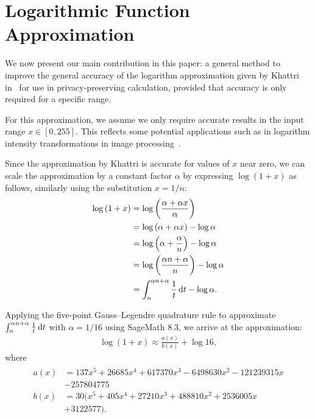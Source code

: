 \section{Logarithmic Function Approximation}
\label{sec:logarithm_approximation}
We now present our main contribution in this paper: a general method to improve the general accuracy of the logarithm approximation given by Khattri in~\cite{khattri_new_2009} for use in privacy-preserving calculation, provided that accuracy is only required for a specific range.

For this approximation, we assume we only require accurate results in the input range $x \in [0, 255]$. This reflects some potential applications such as in logarithm intensity transformations in image processing~\cite{gonzalez_digital_2008}.

Since the approximation by Khattri is accurate for values of $x$ near zero, we can scale the approximation by a constant factor $\alpha$ by expressing $\log(1+x)$ as follows, similarly using the substitution $x=1/n$:
\begin{align*}
	\log{\left(1+x\right)} &= \log{\left(\frac{\alpha + \alpha x}{\alpha}\right)}\\
	&= \log{(\alpha + \alpha x)} - \log{\alpha}\\
	&= \log{\left(\alpha+\frac{\alpha}{n}\right)} - \log{\alpha}\\
	&= \log{\left(\frac{\alpha n + \alpha}{n}\right)} - \log{\alpha}\\
	&= \int_{n}^{\alpha n + \alpha}{\frac{1}{t}\mathop{}\!\mathrm{d} t} - \log{\alpha}.
\end{align*}

Applying the five-point Gauss--Legendre quadrature rule to approximate $\int_{n}^{\alpha n + \alpha}{\frac{1}{t}\mathop{}\!\mathrm{d} t}$ with $\alpha = 1/16$ using SageMath 8.3, we arrive at the approximation:
\begin{align}\label{eq:optimal_log_approximation}
		\log\left(1+x\right) \approx \frac{a(x)}{b(x)} + \log{16},
\end{align}
where
\begin{align*}
	\begin{split}
	a(x) &= 137x^5 + 26685x^4 + 617370x^3 - 6498630x^2 - 121239315x \\
		&- 257804775\\
	b(x) &= 30(x^5 + 405x^4 + 27210x^3 + 488810x^2 + 2536005x\\
		&+ 3122577).
	\end{split}
\end{align*}

